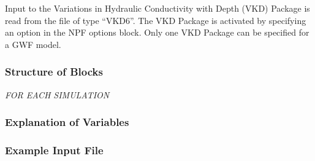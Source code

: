 Input to the Variations in Hydraulic Conductivity with Depth (VKD) Package is read from the file of type ``VKD6''.  The VKD Package is activated by specifying an option in the NPF options block.  Only one VKD Package can be specified for a GWF model.

\vspace{5mm}
\subsubsection{Structure of Blocks}
\vspace{5mm}

\noindent \textit{FOR EACH SIMULATION}




\vspace{5mm}
\subsubsection{Explanation of Variables}
\begin{description}

\end{description}

\vspace{5mm}
\subsubsection{Example Input File}

